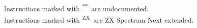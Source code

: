 \documentclass[12pt,twoside,openright,a4paper]{book}
\newcommand{\UNDOC}{\textnormal{\textsuperscript{**}}}
\newcommand{\ZXN}{\textnormal{\textsuperscript{ZX}}}
\begin{document}

Instructions marked with \UNDOC ~are undocumented.\\
Instructions marked with \ZXN ~are ZX Spectrum Next extended.
\end{document}
